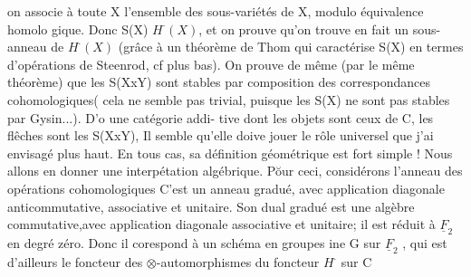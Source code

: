

 on associe à toute X 
 l'ensemble  des sous-variétés  de X, modulo équivalence homolo%
gique. Donc S(X) \handwritten{$\subset$} $H^{\cdot}(X)$, et on prouve qu'on trouve en fait un sous-
anneau de $H^{\cdot}(X)$ (grâce à un théorème de Thom qui caractérise S(X) en
termes d'opérations de Steenrod, cf plus bas). On prouve de même
(par le même théorème) que les S(XxY) sont stables par composition des
correspondances cohomologiques( cela ne semble pas trivial, puisque
les S(X) ne sont pas stables par Gysin...). D'o une catégorie addi-
tive dont les objets sont ceux de C, les flêches sont les S(XxY),
Il semble qu'elle doive jouer le rôle universel que j'ai envisagé
plus haut. En tous cas, sa définition géométrique est fort simple !
Nous allons en donner une interpétation algébrique. P\u{o}ur ceci,
considérons l'anneau des opérations cohomologiques  
 C'est un anneau gradué, avec
application diagonale anticommutative,  associative et unitaire. Son
dual gradué est une algèbre  commutative,avec application diagonale
associative et unitaire; il est réduit à $\underline{F}_2$ en degré zéro. Donc il
corespond à un schéma en groupes ine G sur $\underline{F}_2$ , qui est d'ailleurs
le foncteur des $\otimes$-automorphismes  du foncteur $H^{\cdot}$ sur C 

